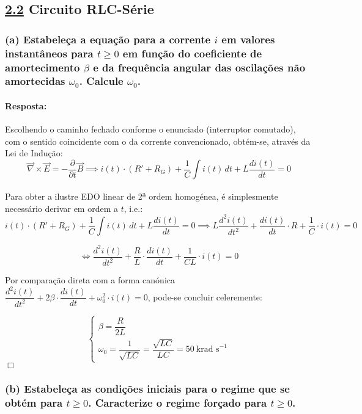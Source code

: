 \clearpage
\def\delequal{\mathrel{\ensurestackMath{\stackon[1pt]{=}{\scriptstyle\Delta}}}}
\subsection*{\underline{2.2} Circuito RLC-Série}
\subsubsection*{(a) Estabeleça a equação para a corrente ${i}$ em valores instantâneos para ${t \ge 0}$ em função do coeficiente de amortecimento ${\beta}$ e da frequência angular das oscilações não amortecidas ${\omega_0}$.
Calcule $\omega_0$.}
\label{subsubsec_a2}
\paragraph{Resposta:}
Escolhendo o caminho fechado conforme o enunciado (interruptor comutado), com o sentido coincidente com o da corrente convencionado, obtém-se, através da Lei de Indução:
$$
    \overrightarrow{\nabla} \times \overrightarrow{E} = -\dfrac{\partial}{\partial t}\overrightarrow{B} \implies i(t)\cdot (R' + R_G) + \frac{1}{C} \int i(t)\, dt + L \frac{di(t)}{dt} = 0
$$

Para obter a ilustre EDO linear de 2\textsuperscript{\underline{a}} ordem homogénea, é simplesmente necessário derivar em ordem a $t$, i.e.:
$$
    i(t)\cdot (R' + R_G) + \frac{1}{C} \int i(t)\, dt + L \frac{di(t)}{dt} = 0 \implies  L \frac{d^2i(t)}{dt^2} + \frac{di(t)}{dt}\cdot R + \frac{1}{C}\cdot i(t) = 0
$$

$$
    \iff \frac{d^2i(t)}{dt^2} + \frac{R}{L} \cdot \frac{di(t)}{dt} + \frac{1}{CL}\cdot i(t) = 0
$$

Por comparação direta com a forma canónica $\dfrac{d^2i(t)}{dt^2} + 2\beta \cdot \dfrac{di(t)}{dt} + \omega_{0}^{2}\cdot i(t) = 0$, pode-se concluir celeremente:

$$
    \begin{cases}
        \beta = \dfrac{R}{2L} \\
        \omega_0 = \dfrac{1}{\sqrt{LC}} = \dfrac{\sqrt{LC}}{LC} = 50\ \text{krad s}^{-1}
    \end{cases}
$$
\hfill \ensuremath{\Box}
\subsubsection*{(b) Estabeleça as condições iniciais para o regime que se obtém para ${t \ge 0}$. Caracterize o regime forçado para ${t \ge 0}$.}
\label{subsubsec_b2}
